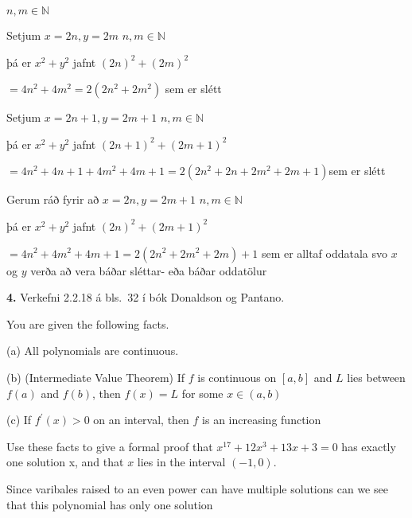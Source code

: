 \documentclass[12pt]{article}
\begin{document}


$n,m\in \mathbb{N} $




Setjum $x=2n, y=2m$   $n,m\in \mathbb{N}$

þá er $x^2 + y^2$ jafnt $(2n)^2 + (2m)^2$

$= 4n^2+4m^2 = 2(2n^2 +2m^2)$ sem er slétt 

Setjum $x=2n+1, y=2m+1$   $n,m\in \mathbb{N}$

þá er $x^2 + y^2$ jafnt $(2n+1)^2 + (2m+1)^2$

$= 4n^2+4n+1+4m^2+4m+1 = 2(2n^2+2n+2m^2+2m+1)$sem er slétt

Gerum ráð fyrir að $x = 2n, y = 2m+1$   $n,m\in \mathbb{N} $ 

þá er $x^2 + y^2$ jafnt $(2n)^2 + (2m+1)^2$

$= 4n^2+4m^2 +4m +1 = 2(2n^2 +2m^2 +2m)+1$ sem er alltaf oddatala svo $x$ og $y$ verða að vera báðar sléttar- eða báðar oddatölur


\smallskip
\bigskip
\bigskip

{\bf 4.}  Verkefni 2.2.18 á bls.~32 í bók Donaldson og Pantano.

You are given the following facts.

(a) All polynomials are continuous.

(b) (Intermediate Value Theorem) If $f$ is continuous on $[a,b]$ and $L$ lies between $f(a)$ and $f(b)$, then $f(x)=L$ for some $x\in (a,b)$

(c) If $f^{'} (x)>0$ on an interval, then $f$ is an increasing function

Use these facts to give a formal proof that $x^17 + 12x^3 + 13x + 3 = 0$ has exactly one solution x, and that $x$ lies in the interval $(-1, 0)$.

Since varibales raised to an even power can have multiple solutions can we see that this polynomial has only one solution
\end{document}
